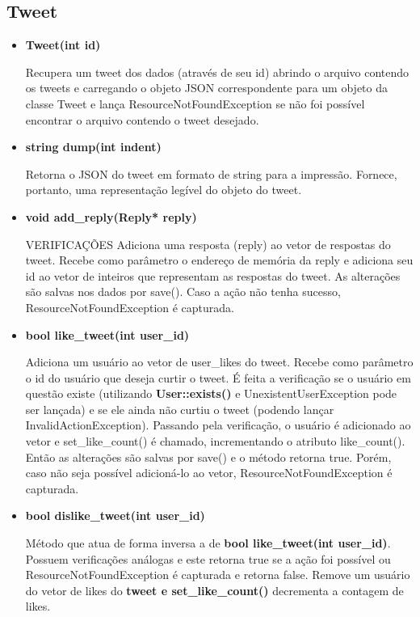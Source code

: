 \documentclass[a4paper]{article}
\begin{document}
\subsection{Tweet}
\begin{itemize}
    \item \textbf{Tweet(int id)}

    Recupera um tweet dos dados (através de seu id) abrindo o arquivo contendo os tweets e carregando o objeto JSON correspondente para um objeto da classe Tweet e lança ResourceNotFoundException se não foi possível encontrar o arquivo contendo o tweet desejado.

    \item \textbf{string dump(int indent)}

    Retorna o JSON do tweet em formato de string para a impressão. Fornece, portanto, uma representação legível do objeto do tweet.

    \item \textbf{void add\_reply(Reply* reply)}

    VERIFICAÇÕES Adiciona uma resposta (reply) ao vetor de respostas do tweet. Recebe como parâmetro o endereço de memória da reply e adiciona seu id ao vetor de inteiros que representam as respostas do tweet. As alterações são salvas nos dados por save(). Caso a ação não tenha sucesso, ResourceNotFoundException é capturada.

    \item \textbf{bool like\_tweet(int user\_id)}

    Adiciona um usuário ao vetor de user\_likes do tweet. Recebe como parâmetro o id do usuário que deseja curtir o tweet. É feita a verificação se o usuário em questão existe (utilizando \textbf{User::exists()} e UnexistentUserException pode ser lançada) e se ele ainda não curtiu o tweet (podendo lançar InvalidActionException). Passando pela verificação, o usuário é adicionado ao vetor e set\_like\_count() é chamado, incrementando o atributo like\_count(). Então as alterações são salvas por save() e o método retorna true. Porém, caso não seja possível adicioná-lo ao vetor, ResourceNotFoundException é capturada.

    \item \textbf{bool dislike\_tweet(int user\_id)}

    Método que atua de forma inversa a de \textbf{bool like\_tweet(int user\_id)}. Possuem verificações análogas e este retorna true se a ação foi possível ou ResourceNotFoundException é capturada e retorna false. Remove um usuário do vetor de likes do \textbf{tweet e set\_like\_count()} decrementa a contagem de likes.


\end{itemize}
\end{document}
